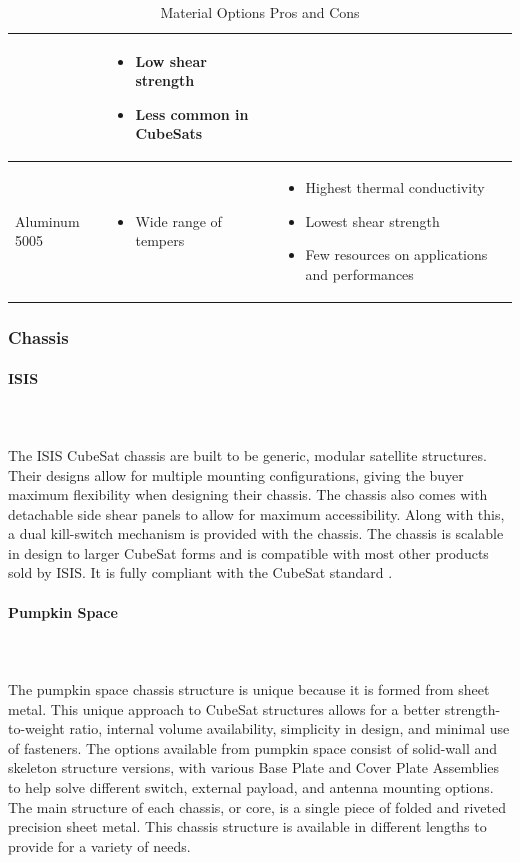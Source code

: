 \begin{table}[H]
\begin{tabular}{|p{}|p{}|p{}|}
    &
    \begin{itemize}
        \item Low shear strength
        \item Less common in CubeSats
    \end{itemize}
    \\
\hline
    Aluminum 5005
    &
    \begin{itemize}
        \item Wide range of tempers
    \end{itemize}
    &
    \begin{itemize}
        \item Highest thermal conductivity
        \item Lowest shear strength
        \item Few resources on applications and performances
    \end{itemize}
    \\
\hline
\end{tabular}
\caption{Material Options Pros and Cons}
\label{tbl:Material_ProCon}
\end{table}

\subsubsection{Chassis}

\paragraph{ISIS} ~\\~\\
The ISIS CubeSat chassis are built to be generic, modular satellite structures. Their designs allow for multiple mounting configurations, giving the buyer maximum flexibility when designing their chassis. The chassis also comes with detachable side shear panels to allow for maximum accessibility. Along with this, a dual kill-switch mechanism is provided with the chassis. The chassis is scalable in design to larger CubeSat forms and is compatible with most other products sold by ISIS. It is fully compliant with the CubeSat standard \cite{isis2}. 
\paragraph{Pumpkin Space} ~\\~\\
The pumpkin space chassis structure is unique because it is formed from sheet metal. This unique approach to CubeSat structures allows for a better strength-to-weight ratio, internal volume availability, simplicity in design, and minimal use of fasteners. The options available from pumpkin space consist of solid-wall and skeleton structure versions, with various Base Plate and Cover Plate Assemblies to help solve different switch, external payload, and antenna mounting options. The main structure of each chassis, or core, is a single piece of folded and riveted precision sheet metal. This chassis structure is available in different lengths to provide for a variety of needs.\cite{pumpkin_space} 
